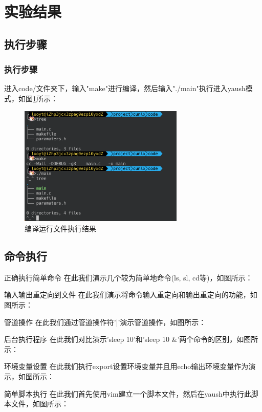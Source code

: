 \documentclass[10pt]{beamer}
\begin{document}
\section{实验结果}
\subsection{执行步骤}
\begin{frame}
\frametitle{执行步骤}
进入code/文件夹下，输入"make"进行编译，然后输入"./main"执行进入yaush模式，如图\ref{init}所示：
\begin{figure}[htbp]
	\centering
	\includegraphics[width=0.7\textwidth]{images/init}
	\caption{\label{init}编译运行文件执行结果}
\end{figure}
\end{frame}

\subsection{命令执行}
\begin{frame}{正确执行简单命令}
在此我们演示几个较为简单地命令(ls, sl, cd等)，如图所示：
\end{frame}

\begin{frame}{输入输出重定向到文件}
在此我们演示将命令输入重定向和输出重定向的功能，如图所示：
\end{frame}

\begin{frame}{管道操作}
在此我们通过管道操作符'|'演示管道操作，如图所示：
\end{frame}

\begin{frame}{后台执行程序}
在此我们对比演示'sleep 10'和'sleep 10 \&'两个命令的区别，如图所示：
\end{frame}

\begin{frame}{环境变量设置}
在此我们执行export设置环境变量并且用echo输出环境变量作为演示，如图所示：
\end{frame}
\begin{frame}{简单脚本执行}
在此我们首先使用vim建立一个脚本文件，然后在yaush中执行此脚本文件，如图所示：
\end{frame}
\end{document}
